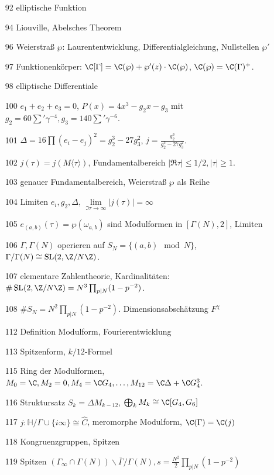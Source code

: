 \documentclass{article}
\newcommand{\SL}{\operatorname{SL}}
\begin{document}
\begin{itemize}
    \item[92] elliptische Funktion
    \item[94] Liouville,  Abelsches Theorem
    \item[96] Weierstraß $\wp$: Laurententwicklung, Differentialgleichung, Nullstellen $\wp'$
    \item[97] Funktionenkörper: $\C[\Gamma] = \C(\wp) + \wp'(z) \cdot \C(\wp)$, $\C(\wp) = \C(\Gamma)^+$.
    \item[98] elliptische Differentiale 
    \item[100] $e_1 + e_2 + e_3 = 0$, $P(x) = 4x^3 - g_2x - g_3$ mit $g_2 = 60\sum' \gamma^{-4}, g_3 = 140 \sum' \gamma^{-6}$. 
    \item[101] $\Delta = 16 \prod (e_i-e_j)^2 = g_2^3 - 27g_3^2$, $j = \frac{g_2^3}{g_2^3 - 27g_3^2}$.
    \item[102] $j(\tau) = j(M\langle \tau \rangle)$, Fundamentalbereich $|\Re \tau | \leq 1/2, |\tau| \geq 1$.
    \item[103] genauer Fundamentalbereich, Weierstraß $\wp$ als Reihe 
    \item[104] Limiten $e_i, g_2, \Delta$, $\lim\limits_{\Im \tau \to \infty} |j(\tau)| = \infty$
    \item[105] $e_{(a,b)}(\tau) = \wp(\omega_{a,b})$ sind Modulformen in $[\Gamma(N), 2]$, Limiten
    \item[106] $\Gamma, \Gamma(N)$ operieren auf $S_N = \{(a,b) \mod N\}$, $\Gamma/\Gamma(N) \cong \SL(2, \Z/N\Z)$.
    \item[107] elementare Zahlentheorie, Kardinalitäten: $\# \SL(2, \Z/N\Z) = N^3\prod_{p|N} (1-p^{-2})$.
    \item[108] $\# S_N = N^2 \prod_{p|N} (1-p^{-2})$. Dimensionsabschätzung $F^\chi$
    \item[112] Definition Modulform, Fourierentwicklung
    \item[113] Spitzenform, $k/12$-Formel
    \item[115] Ring der Modulformen, $M_0 = \C, M_2 = 0, M_4 = \C G_4, \dots, M_{12} = \C\Delta + \C G_4^3$.
    \item[116] Struktursatz $S_k = \Delta M_{k-12}$, $\bigoplus_k M_k \cong \C[G_4, G_6]$
    \item[117] $j \colon \mathbb{H} /\Gamma \cup \{i\infty\} \cong \hat C$, meromorphe Modulform, $\C(\Gamma) = \C(j)$
    \item[118] Kongruenzgruppen, Spitzen
    \item[119] Spitzen $(\Gamma_\infty \cap \Gamma(N)) \backslash \overline{\Gamma}/\Gamma(N), s = \frac{N^2}{2} \prod_{p|N} (1-p^{-2})$

\end{itemize}
\end{document}
